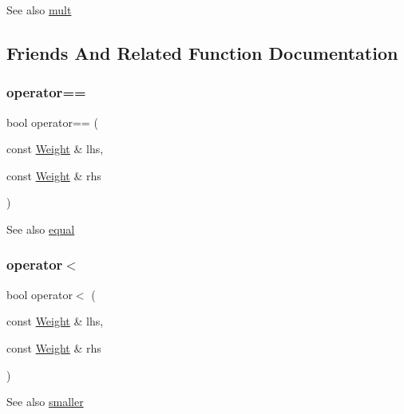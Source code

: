 \begin{DoxySeeAlso}{See also}
\mbox{\hyperlink{group__weight_ga7188f571e507d7f31b76de7faebdb78f}{mult}} 
\end{DoxySeeAlso}


\subsection{Friends And Related Function Documentation}
\mbox{\label{classWeight_a2908b386adb4cbc893dcf9f631b8a85d}} 
\subsubsection{\texorpdfstring{operator==}{operator==}}
{\footnotesize\ttfamily bool operator== (\begin{DoxyParamCaption}\item[{const \mbox{\hyperlink{classWeight}{Weight}} \&}]{lhs,  }\item[{const \mbox{\hyperlink{classWeight}{Weight}} \&}]{rhs }\end{DoxyParamCaption})\hspace{0.3cm}{\ttfamily [friend]}}

\begin{DoxySeeAlso}{See also}
\mbox{\hyperlink{group__weight_ga11236e38c2dc7cc66a367c2ea5921c1e}{equal}} 
\end{DoxySeeAlso}
\mbox{\label{classWeight_af75080233bdd2e853a5f3b2b80e262af}} 
\subsubsection{\texorpdfstring{operator$<$}{operator<}}
{\footnotesize\ttfamily bool operator$<$ (\begin{DoxyParamCaption}\item[{const \mbox{\hyperlink{classWeight}{Weight}} \&}]{lhs,  }\item[{const \mbox{\hyperlink{classWeight}{Weight}} \&}]{rhs }\end{DoxyParamCaption})\hspace{0.3cm}{\ttfamily [friend]}}

\begin{DoxySeeAlso}{See also}
\mbox{\hyperlink{group__weight_gab3a3a5fb989514e5673582b9a7107d97}{smaller}} 
\end{DoxySeeAlso}
\mbox{\label{classWeight_a5fa6fc187426e2cc6aa40f7acddf8455}} 
